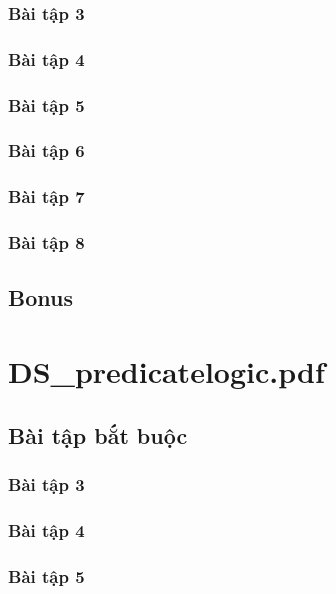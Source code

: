 \documentclass[a4paper]{article}
\begin{document}
\clearpage
\subsubsection{Bài tập 3}

\clearpage
\subsubsection{Bài tập 4}

\clearpage
\subsubsection{Bài tập 5}

\clearpage
\subsubsection{Bài tập 6}

\clearpage
\subsubsection{Bài tập 7}

\clearpage
\subsubsection{Bài tập 8}

\clearpage
\subsection{Bonus}

\clearpage

\section{DS\_predicatelogic.pdf}
\subsection{Bài tập bắt buộc}
\subsubsection{Bài tập 3}

\clearpage
\subsubsection{Bài tập 4}

\clearpage
\subsubsection{Bài tập 5}
\end{document}
